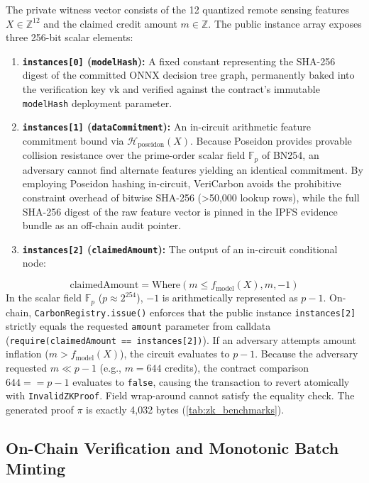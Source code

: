 \documentclass[preprint,12pt]{elsarticle}
\begin{document}
The private witness vector consists of the 12 quantized remote sensing features $X \in \mathbb{Z}^{12}$ and the claimed credit amount $m \in \mathbb{Z}$. The public instance array exposes three 256-bit scalar elements:
\begin{enumerate}
\item \textbf{\texttt{instances[0]} (\texttt{modelHash}):} A fixed constant representing the SHA-256 digest of the committed ONNX decision tree graph, permanently baked into the verification key $\text{vk}$ and verified against the contract's immutable \texttt{modelHash} deployment parameter.
\item \textbf{\texttt{instances[1]} (\texttt{dataCommitment}):} An in-circuit arithmetic feature commitment bound via $\mathcal{H}_{\text{poseidon}}(X)$. Because Poseidon provides provable collision resistance over the prime-order scalar field $\mathbb{F}_p$ of BN254, an adversary cannot find alternate features yielding an identical commitment. By employing Poseidon hashing in-circuit, VeriCarbon avoids the prohibitive constraint overhead of bitwise SHA-256 (>50,000 lookup rows), while the full SHA-256 digest of the raw feature vector is pinned in the IPFS evidence bundle as an off-chain audit pointer.
\item \textbf{\texttt{instances[2]} (\texttt{claimedAmount}):} The output of an in-circuit conditional node:
\end{enumerate}
$$\text{claimedAmount} = \text{Where}(m \le f_{\text{model}}(X), m, -1)$$
In the scalar field $\mathbb{F}_p$ ($p \approx 2^{254}$), $-1$ is arithmetically represented as $p-1$. On-chain, \texttt{CarbonRegistry.issue()} enforces that the public instance \texttt{instances[2]} strictly equals the requested \texttt{amount} parameter from calldata (\texttt{require(claimedAmount == instances[2])}). If an adversary attempts amount inflation ($m > f_{\text{model}}(X)$), the circuit evaluates to $p-1$. Because the adversary requested $m \ll p-1$ (e.g., $m = 644$ credits), the contract comparison $644 == p-1$ evaluates to \texttt{false}, causing the transaction to revert atomically with \texttt{InvalidZKProof}. Field wrap-around cannot satisfy the equality check. The generated proof $\pi$ is exactly 4,032 bytes (\autoref{tab:zk_benchmarks}).

\subsection{On-Chain Verification and Monotonic Batch Minting}
\end{document}
